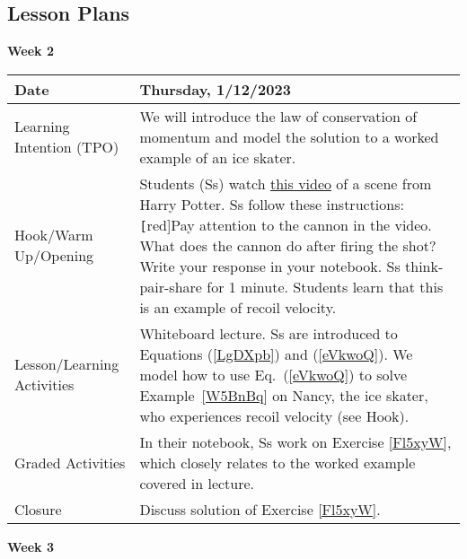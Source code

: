 \documentclass[main.tex]{subfiles}
\begin{document}
\subsection{Lesson Plans}

\textbf{Week 2}
\vspace{1ex}

\begin{tabular}{|m{}|m{}|}
    \hline
    \cellcolor{black!20}\textbf{Date} & \cellcolor{black!20}\textbf{Thursday, 1/12/2023} \\
    \hline
    Learning Intention (TPO) & We will introduce the law of conservation of momentum and model the solution to a worked example of an ice skater. \\
    \hline
    Hook/Warm Up/Opening & Students (Ss) watch \href{https://youtu.be/UqLJjqESlJY}{this video} of a scene from Harry Potter. Ss follow these instructions: \texttt[red]{Pay attention to the cannon in the video. What does the cannon do after firing the shot? Write your response in your notebook.} Ss think-pair-share for 1 minute. Students learn that this is an example of recoil velocity.\\
    \hline
    Lesson/Learning Activities & Whiteboard lecture. Ss are introduced to Equations (\ref{LgDXpb}) and (\ref{eVkwoQ}). We model how to use Eq.~(\ref{eVkwoQ}) to solve Example~\ref{W5BnBq} on Nancy, the ice skater, who experiences recoil velocity (see Hook).\\
    \hline
    Graded Activities & In their notebook, Ss work on Exercise \ref{Fl5xyW}, which closely relates to the worked example covered in lecture.\\
    \hline
    Closure & Discuss solution of Exercise \ref{Fl5xyW}.\\
    \hline
\end{tabular}
\vspace{1ex}

\textbf{Week 3}
\vspace{1ex}
\end{document}
